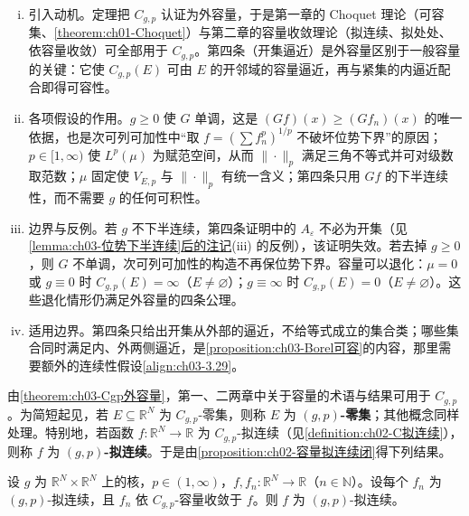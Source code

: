 \documentclass[../../main.tex]{subfiles}%
\begin{document}
\begin{remark}\label{remark:ch03-Cgp外容量}
\begin{enumerate}[(i)]
\item 引入动机。定理把 $C_{g,p}$ 认证为外容量，于是第一章的 Choquet 理论（可容集、\cref{theorem:ch01-Choquet}）与第二章的容量收敛理论（拟连续、拟处处、依容量收敛）可全部用于 $C_{g,p}$。第四条（开集逼近）是外容量区别于一般容量的关键：它使 $C_{g,p}(E)$ 可由 $E$ 的开邻域的容量逼近，再与紧集的内逼近配合即得可容性。

\item 各项假设的作用。$g\geqslant0$ 使 $G$ 单调，这是 $(Gf)(x)\geqslant(Gf_n)(x)$ 的唯一依据，也是次可列可加性中“取 $f=\left(\sum f_n^p\right)^{1/p}$ 不破坏位势下界”的原因；$p\in[1,\infty)$ 使 $L^p(\mu)$ 为赋范空间，从而 $\|\cdot\|_p$ 满足三角不等式并可对级数取范数；$\mu$ 固定使 $V_{E,p}$ 与 $\|\cdot\|_p$ 有统一含义；第四条只用 $Gf$ 的下半连续性，而不需要 $g$ 的任何可积性。

\item 边界与反例。若 $g$ 不下半连续，第四条证明中的 $A_\varepsilon$ 不必为开集（见\hyperref[remark:ch03-位势下半连续]{\cref{lemma:ch03-位势下半连续}后的注记}(iii) 的反例），该证明失效。若去掉 $g\geqslant0$，则 $G$ 不单调，次可列可加性的构造不再保位势下界。容量可以退化：$\mu=0$ 或 $g\equiv0$ 时 $C_{g,p}(E)=\infty$（$E\neq\varnothing$）；$g\equiv\infty$ 时 $C_{g,p}(E)=0$（$E\neq\varnothing$）。这些退化情形仍满足外容量的四条公理。

\item 适用边界。第四条只给出开集从外部的逼近，不给等式成立的集合类；哪些集合同时满足内、外两侧逼近，是\cref{proposition:ch03-Borel可容}的内容，那里需要额外的连续性假设\eqref{align:ch03-3.29}。
\end{enumerate}
\end{remark}

由\cref{theorem:ch03-Cgp外容量}，第一、二两章中关于容量的术语与结果可用于 $C_{g,p}$。为简短起见，若 $E\subseteq\mathbb{R}^N$ 为 $C_{g,p}$-零集，则称 $E$ 为 \textbf{$(g,p)$-零集}；其他概念同样处理。特别地，若函数 $f:\mathbb{R}^N\to\mathbb{R}$ 为 $C_{g,p}$-拟连续（见\cref{definition:ch02-C拟连续}），则称 $f$ 为 \textbf{$(g,p)$-拟连续}。于是由\cref{proposition:ch02-容量拟连续闭}得下列结果。

\begin{proposition}\label{proposition:ch03-拟连续稳定}
设 $g$ 为 $\mathbb{R}^N\times\mathbb{R}^N$ 上的核，$p\in(1,\infty)$，$f,f_n:\mathbb{R}^N\to\mathbb{R}$（$n\in\mathbb{N}$）。设每个 $f_n$ 为 $(g,p)$-拟连续，且 $f_n$ 依 $C_{g,p}$-容量收敛于 $f$。则 $f$ 为 $(g,p)$-拟连续。
\end{proposition}
\end{document}
